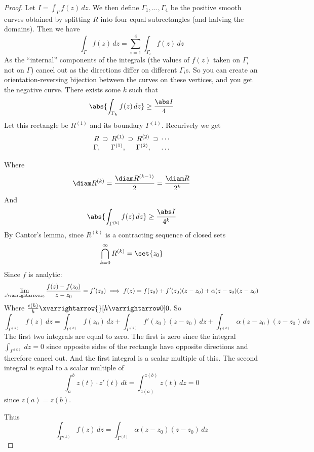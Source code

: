 \documentclass[10pt]{article}
\let\to=\varrightarrow
\begin{document}
\begin{proof}

    Let $I=\int_\Gamma f(z)\,dz$.
    We then define $\Gamma_1,\dots,\Gamma_4$ be the positive smooth curves obtained by splitting $R$ into four equal subrectangles (and halving the domains).
    Then we have
    \[ \int_\Gamma f(z)\,dz = \sum_{i=1}^4 \int_{\Gamma_i} f(z)\,dz \]
    As the ``internal'' components of the integrals (the values of $f(z)$ taken on $\Gamma_i$ not on $\Gamma$) cancel out as the directions differ on different $\Gamma_i$s.
    So you can create an orientation-reversing bijection between the curves on these vertices, and you get the negative curve.
    There exists some $k$ such that
    \[ \abs{\int_{\Gamma_k} f(z)\,dz} \geq \frac{\abs I}4 \]
    Let this rectangle be $R^{(1)}$ and its boundary $\Gamma^{(1)}$.
    Recurively we get
    \[ \arraycolsep=2pt \begin{array}{ccccccc}
        R & \supset & R^{(1)} & \supset & R^{(2)} & \supset & \cdots \\
        \Gamma, & & \Gamma^{(1)}, & & \Gamma^{(2)}, & & \dots 
    \end{array} \]

    Where
    \[ \diam R^{(k)} = \frac{\diam R^{(k-1)}}2 = \frac{\diam R}{2^k} \]
    And
    \[ \abs{\int_{\Gamma^{(k)}} f(z)\,dz} \geq \frac{\abs I}{4^k} \]
    By Cantor's lemma, since $R^{(k)}$ is a contracting sequence of closed sets
    \[ \bigcap_{k=0}^\infty R^{(k)} = \set{z_0} \]
    Since $f$ is analytic:
    \[ \lim_{z\to z_0} \frac{f(z) - f(z_0)}{z-z_0} = f'(z_0) \implies f(z) = f(z_0) + f'(z_0)(z-z_0) + \alpha(z-z_0)(z-z_0) \]
    Where $\frac{\epsilon(h)}h\xvarrightarrow{}[h\to0]0$.
    So
    \[ \int_{\Gamma^{(k)}}f(z)\,dz = \int_{\Gamma^{(k)}} f(z_0)\,dz + \int_{\Gamma^{(k)}} f'(z_0)(z-z_0)\,dz + \int_{\Gamma^{(k)}} \alpha(z-z_0)(z-z_0)\,dz \]
    The first two integrals are equal to zero.
    The first is zero since the integral $\int_{\Gamma^{(k)}}\,dz=0$ since opposite sides of the rectangle have opposite directions and therefore cancel out.
    And the first integral is a scalar multiple of this.
    The second integral is equal to a scalar multiple of
    \[ \int_a^b z(t)\cdot z'(t)\,dt = \int_{z(a)}^{z(b)} z(t)\,dz = 0 \]
    since $z(a)=z(b)$.

    Thus
    \[ \int_{\Gamma^{(k)}}f(z)\,dz = \int_{\Gamma^{(k)}}\alpha(z-z_0)(z-z_0)\,dz \]


\end{proof}
\end{document}
